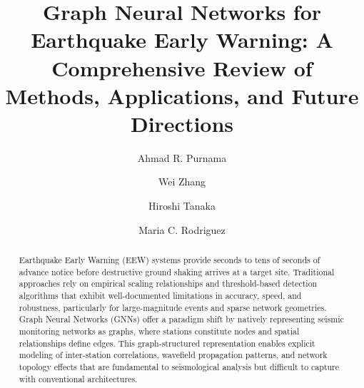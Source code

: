 \documentclass[review,authoryear]{elsarticle}
\begin{document}
\begin{frontmatter}

\title{Graph Neural Networks for Earthquake Early Warning: A Comprehensive Review of Methods, Applications, and Future Directions}

\author[inst1,inst2]{Ahmad R. Purnama}
\author[inst1]{Wei Zhang}
\author[inst2]{Hiroshi Tanaka}
\author[inst3]{Maria C. Rodriguez}



\begin{abstract}
Earthquake Early Warning (EEW) systems provide seconds to tens of seconds of advance notice before destructive ground shaking arrives at a target site. Traditional approaches rely on empirical scaling relationships and threshold-based detection algorithms that exhibit well-documented limitations in accuracy, speed, and robustness, particularly for large-magnitude events and sparse network geometries. Graph Neural Networks (GNNs) offer a paradigm shift by natively representing seismic monitoring networks as graphs, where stations constitute nodes and spatial relationships define edges. This graph-structured representation enables explicit modeling of inter-station correlations, wavefield propagation patterns, and network topology effects that are fundamental to seismological analysis but difficult to capture with conventional architectures.


\end{abstract}
\end{frontmatter}
\end{document}
